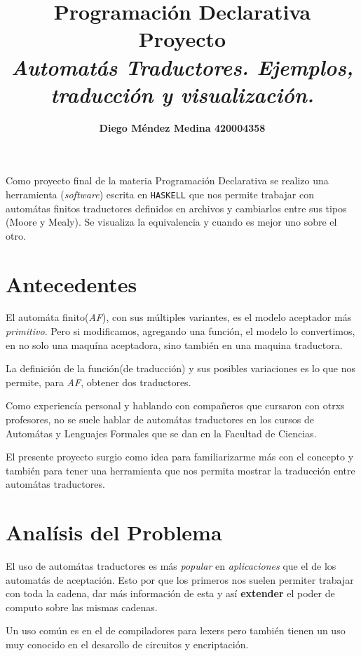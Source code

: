 \documentclass[11pt,letterpaper]{article}
\title{Programación Declarativa \\ {\Reporte Proyecto}\\
  {\it Automatás Traductores. Ejemplos, traducción y visualización.}}
\date{}
\author{{\bf Diego Méndez Medina  420004358}}
\begin{document}
\maketitle

\tableofcontents

\vspace{1cm}
Como proyecto final de la materia Programación Declarativa se realizo
una herramienta ({\it software}) escrita en {\tt HASKELL} que nos permite
trabajar con automátas finitos traductores definidos en archivos
y cambiarlos entre sus tipos (Moore y Mealy). Se visualiza la equivalencia y cuando es
mejor uno sobre el otro.
\begin{multicols}{2}
  
  \section{Antecedentes}

  El automáta finito({\it AF}), con sus múltiples variantes,
  es el modelo aceptador más {\it primitivo}. Pero
  si modificamos, agregando una función, el modelo
  lo convertimos, en no solo una maquína aceptadora,
  sino también en una maquina traductora.

  La definición de la función(de traducción) y sus posibles variaciones
  es lo que nos permite, para {\it AF}, obtener dos traductores\cite{Viso}.
  
  Como experiencía personal y hablando con compañeros
  que cursaron con otrxs profesores, no se suele
  hablar de automátas traductores en los cursos de Automátas
  y Lenguajes Formales que se dan en la Facultad de Ciencias.

  El presente proyecto surgio como idea para familiarizarme
  más con el concepto y también para tener una herramienta
  que nos permita mostrar la traducción entre automátas traductores.  
  \section{Analísis del Problema}
  
  El uso de automátas traductores es más {\it popular} en {\it aplicaciones}
  que el de los automatás de aceptación. Esto por que los primeros
  nos suelen permiter trabajar con toda la cadena, dar más información de esta
  y así {\bf extender} el poder de computo sobre las mismas cadenas.

  Un uso común es en el de compiladores para lexers pero también tienen
  un uso muy conocido en el desarollo de circuitos y encriptación.


\end{multicols}
\end{document}
